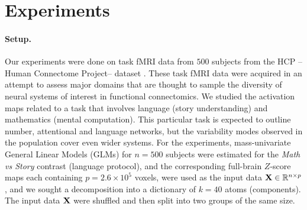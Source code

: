 
%

\section{Experiments}
\label{sec:exp}
\paragraph*{Setup.} Our experiments were done on task fMRI data from $500$ subjects
from the HCP --Human Connectome Project-- dataset
  \citep{VanEssen20122222}. These task fMRI data were acquired in an
attempt to assess major domains that are thought to sample the
diversity of neural systems of interest in functional connectomics.
We studied the activation maps related to a task that involves
language (story understanding) and mathematics (mental
computation). This particular task is expected to outline number, attentional and
language networks, but the variability modes observed in the
population cover even wider systems. For the experiments,
mass-univariate  General Linear Models (GLMs)   \citep{friston1995} for
$n=500$ subjects
were estimated for the \emph{Math vs Story} contrast (language
protocol), and the corresponding full-brain $Z$-score maps each
containing $p=2.6 \times 10^5$ voxels, were used as the input data $\mathbf{X} \in
\mathbb R^{n \times p}$,  and we
sought a decomposition into a dictionary of $k = 40$ atoms (components).
The input data $\mathbf{X}$ were shuffled and then split into two groups of the same
size.


